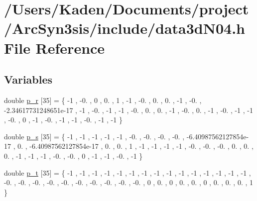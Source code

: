 \hypertarget{a00488}{}\section{/\+Users/\+Kaden/\+Documents/project/\+Arc\+Syn3sis/include/data3d\+N04.h File Reference}
\label{a00488}
\subsection*{Variables}
\begin{DoxyCompactItemize}
\item 
double \hyperlink{a00488_a325a84e3e6f6058f997996098055b862}{p\+\_\+r} \mbox{[}35\mbox{]} = \{ -\/1 , -\/0. , 0 , 0. , 1 , -\/1 , -\/0. , 0. , 0. , -\/1 , -\/0. , -\/2.\+34617731248651e-\/17 , -\/1 , -\/0. , -\/1 , -\/1 , -\/0. , 0. , 0. , -\/1 , -\/0. , 0. , -\/1 , -\/0. , -\/1 , -\/1 , -\/0. , 0 , -\/1 , -\/0. , -\/1 , -\/1 , -\/0. , -\/1 , -\/1 \}
\item 
double \hyperlink{a00488_aadf5b12c615d94dd47bba4bb60129295}{p\+\_\+s} \mbox{[}35\mbox{]} = \{ -\/1 , -\/1 , -\/1 , -\/1 , -\/1 , -\/0. , -\/0. , -\/0. , -\/0. , -\/6.\+40987562127854e-\/17 , 0. , -\/6.\+40987562127854e-\/17 , 0. , 0. , 1 , -\/1 , -\/1 , -\/1 , -\/1 , -\/0. , -\/0. , -\/0. , 0. , 0. , 0. , -\/1 , -\/1 , -\/1 , -\/0. , -\/0. , 0 , -\/1 , -\/1 , -\/0. , -\/1 \}
\item 
double \hyperlink{a00488_aa286b19aa5557ad987ee559f47e1e4a9}{p\+\_\+t} \mbox{[}35\mbox{]} = \{ -\/1 , -\/1 , -\/1 , -\/1 , -\/1 , -\/1 , -\/1 , -\/1 , -\/1 , -\/1 , -\/1 , -\/1 , -\/1 , -\/1 , -\/1 , -\/0. , -\/0. , -\/0. , -\/0. , -\/0. , -\/0. , -\/0. , -\/0. , -\/0. , -\/0. , 0 , 0. , 0 , 0. , 0. , 0 , 0. , 0. , 0. , 1 \}

\end{DoxyCompactItemize}
